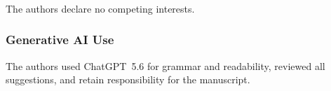 \documentclass[runningheads]{llncs}
\begin{document}
\begin{credits}
\subsubsection{\discintname}
The authors declare no competing interests.
\subsubsection{Generative AI Use}
The authors used \mbox{ChatGPT 5.6} for grammar and readability, reviewed all
suggestions, and retain responsibility for the manuscript.
\end{credits}

\begingroup
\makeatletter
\let\psqoldthebibliography\thebibliography
\renewcommand{\thebibliography}[1]{%
  \psqoldthebibliography{#1}%
  \fontsize{7.8}{8.2}\selectfont
  \setlength{\itemsep}{0pt}%
  \setlength{\parsep}{0pt}%
}
\makeatother


\endgroup
\end{document}
